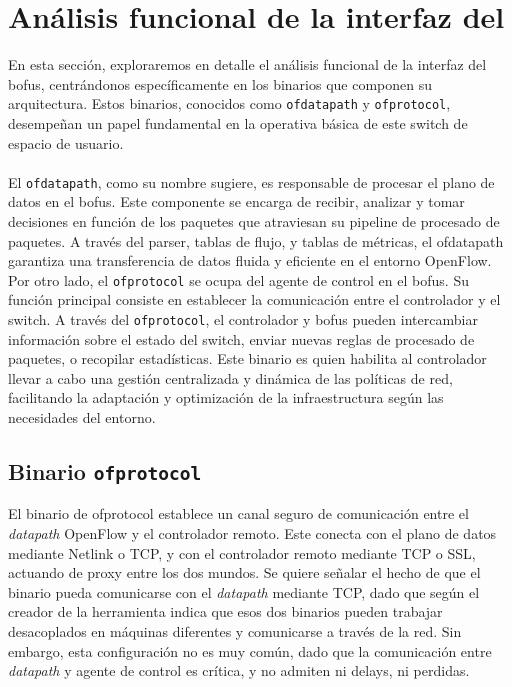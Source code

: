 \section{Análisis funcional de la interfaz del }
\label{sec:ana_bofuss}

En esta sección, exploraremos en detalle el análisis funcional de la interfaz del \gls{bofus}, centrándonos específicamente en los binarios que componen su arquitectura. Estos binarios, conocidos como \texttt{ofdatapath} y \texttt{ofprotocol}, desempeñan un papel fundamental en la operativa básica de este switch de espacio de usuario.\\
\\
El \texttt{ofdatapath}, como su nombre sugiere, es responsable de procesar el plano de datos en el \gls{bofus}. Este componente se encarga de recibir, analizar y tomar decisiones en función de los paquetes que atraviesan su pipeline de procesado de paquetes. A través del parser, tablas de flujo, y tablas de métricas, el ofdatapath garantiza una transferencia de datos fluida y eficiente en el entorno OpenFlow. Por otro lado, el \texttt{ofprotocol} se ocupa del agente de control en el \gls{bofus}. Su función principal consiste en establecer la comunicación entre el controlador y el switch. A través del \texttt{ofprotocol}, el controlador y \gls{bofus} pueden intercambiar información sobre el estado del switch, enviar nuevas reglas de procesado de paquetes, o recopilar estadísticas. Este binario es quien habilita al controlador llevar a cabo una gestión centralizada y dinámica de las políticas de red, facilitando la adaptación y optimización de la infraestructura según las necesidades del entorno.\\


\subsection{Binario \texttt{ofprotocol}}

El binario de ofprotocol establece un canal seguro de comunicación entre el \textit{datapath} OpenFlow y el controlador remoto. Este conecta con el plano de datos mediante Netlink o TCP, y con el controlador remoto mediante TCP o SSL, actuando de proxy entre los dos mundos. Se quiere señalar el hecho de que el binario pueda comunicarse con el \textit{datapath} mediante TCP, dado que según el creador de la herramienta indica que esos dos binarios pueden trabajar desacoplados en máquinas diferentes y comunicarse a través de la red. Sin embargo, esta configuración no es muy común, dado que la comunicación entre \textit{datapath} y agente de control es crítica, y no admiten ni delays, ni perdidas.\\


